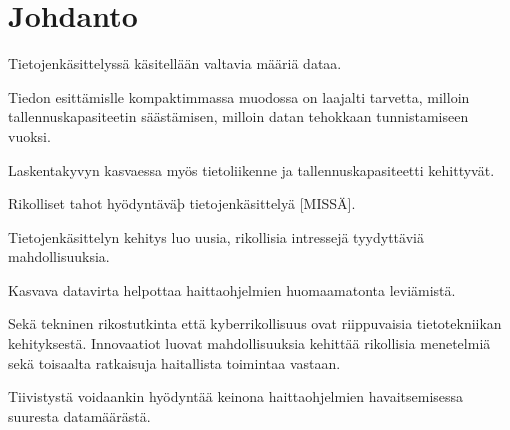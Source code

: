 \chapter{Johdanto}

Tietojenkäsittelyssä käsitellään valtavia määriä dataa.

Tiedon esittämislle kompaktimmassa muodossa on laajalti
  tarvetta, milloin tallennuskapasiteetin säästämisen,
  milloin datan tehokkaan tunnistamiseen vuoksi.

Laskentakyvyn kasvaessa myös tietoliikenne ja tallennuskapasiteetti kehittyvät.

Rikolliset tahot hyödyntäväþ tietojenkäsittelyä [MISSÄ].

Tietojenkäsittelyn kehitys luo uusia, rikollisia intressejä tyydyttäviä mahdollisuuksia.

Kasvava datavirta helpottaa haittaohjelmien huomaamatonta
  leviämistä.

Sekä tekninen rikostutkinta että kyberrikollisuus
  ovat riippuvaisia tietotekniikan kehityksestä.
Innovaatiot luovat mahdollisuuksia kehittää
  rikollisia menetelmiä sekä toisaalta ratkaisuja
  haitallista toimintaa vastaan.

Tiivistystä voidaankin hyödyntää keinona haittaohjelmien havaitsemisessa suuresta datamäärästä.




